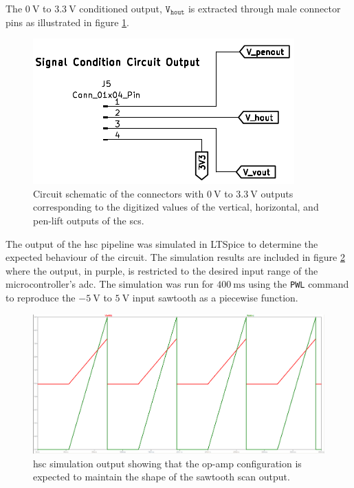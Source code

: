 \documentclass[class=report,11pt,crop=false]{standalone}
\begin{document}
	The $\SI{0}{\volt}$ to $\SI{3.3}{\volt}$ conditioned output, $\texttt{V}_\texttt{hout}$ is extracted through male connector pins as illustrated in figure \ref{fig:sig-cond-output-schematic}. 
	

	
	\begin{figure}[h!]
		\centering
		\includegraphics[width=0.35\linewidth]{Figures/Methodology/sig-cond-output-ct-schematic}
		\caption{Circuit schematic of the connectors with $\SI{0}{\volt}$ to $\SI{3.3}{\volt}$ outputs corresponding to the digitized values of the vertical, horizontal, and pen-lift outputs of the \acrshort{scs}.}
		\label{fig:sig-cond-output-schematic}
	\end{figure}
	
	The output of the \acrshort{hsc} pipeline was simulated in LTSpice to determine the expected behaviour of the circuit. The simulation results are included in figure \ref{fig:sig-cond-hsc-sim-output} where the output, in purple, is restricted to the desired input range of the microcontroller's \acrshort{adc}. The simulation was run for $\SI{400}{\milli\second}$ using the \texttt{PWL} command to reproduce the $-\SI{5}{\volt}$ to $\SI{5}{\volt}$ input sawtooth as a piecewise function.  
	
	\begin{figure}[h!]
		\centering
		\includegraphics[width=0.7\linewidth]{Figures/Methodology/sig-cond-hsc-sim-output}
		\caption{\acrshort{hsc} simulation output showing that the op-amp configuration is expected to maintain the shape of the sawtooth scan output.}
		\label{fig:sig-cond-hsc-sim-output}
	\end{figure}
\end{document}

